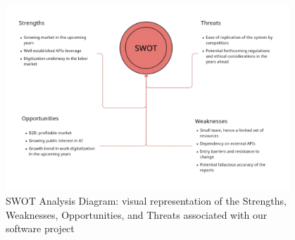 \documentclass{article}
\begin{document}
\begin{figure}[h]
  \centering
  \includegraphics[width=0.95\textwidth]{swat_cropped.png}
  \caption{\small SWOT Analysis Diagram: visual representation of the Strengths, Weaknesses, Opportunities, and Threats associated with our software project}
\end{figure}
\end{document}
